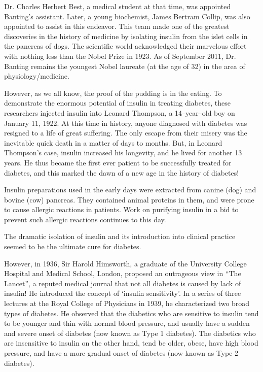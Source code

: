 Dr. Charles Herbert Best, a medical student at that time, was appointed Banting’s assistant. Later, a young biochemist, James Bertram Collip, was also appointed to assist in this endeavor. This team made one of the greatest discoveries in the history of medicine by isolating insulin from the islet cells in the pancreas of dogs. The scientific world ack\-nowledged their marvelous effort with no\-thing less than the Nobel Prize in 1923. As of September 2011, Dr. Banting remains the youngest Nobel laureate (at the age of 32) in the area of physiology/medicine.

However, as we all know, the proof of the pudding is in the eating. To demonstrate the enormous potential of insulin in treating diabetes, these researchers injected insulin into Leonard Thompson, a 14–year–old boy on January 11, 1922. At this time in history, anyone diagnosed with diabetes was resigned to a life of great suffering. The only escape from their misery was the inevitable quick death in a matter of days to months. But, in Leonard Thompson’s case, insulin increased his longevity, and he lived for another 13 years. He thus became the first ever patient to be successfully treated for diabetes, and this marked the dawn of a new age in the history of diabetes!

Insulin preparations used in the early days were extracted from canine (dog) and bovine (cow) pancreas. They contained animal proteins in them, and were prone to cause allergic reactions in patients. Work on purifying insulin in a bid to prevent such allergic reactions continues to this day.

The dramatic isolation of insulin and its introduction into clinical practice seemed to be the ultimate cure for diabetes.

However, in 1936, Sir Harold Himsworth, a graduate of the University College Hospital and Medical School, London, proposed an outrageous view in “The Lancet”, a reputed medical journal that not all diabetes is caused by lack of insulin! He introduced the concept of ‘insulin sensitivity’. In a series of three lectures at the Royal College of Physicians in 1939, he characterized two broad types of diabetes. He observed that the diabetics who are sensitive to insulin tend to be younger and thin with normal blood pressure, and usually have a sudden and severe onset of diabetes (now known as Type 1 diabetes). The diabetics who are insensitive to insulin on the other hand, tend be older, obese, have high blood pressure, and have a more gradual onset of diabetes (now known as Type 2 diabetes).


